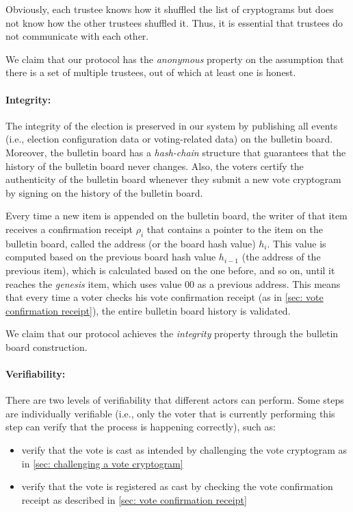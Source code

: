 Obviously, each trustee knows how it shuffled the list of cryptograms but does not know how the other trustees shuffled it. Thus, it is essential that trustees do not communicate with each other.

We claim that our protocol has the \textit{anonymous} property on the assumption that there is a set of multiple trustees, out of which at least one is honest.


\paragraph{Integrity:}
The integrity of the election is preserved in our system by publishing all events (i.e., election configuration data or voting-related data) on the bulletin board. Moreover, the bulletin board has a \textit{hash-chain} structure that guarantees that the history of the bulletin board never changes. Also, the voters certify the authenticity of the bulletin board whenever they submit a new vote cryptogram by signing on the history of the bulletin board.

Every time a new item is appended on the bulletin board, the writer of that item receives a confirmation receipt $\rho_i$ that contains a pointer to the item on the bulletin board, called the address (or the board hash value) $h_i$. This value is computed based on the previous board hash value $h_{i-1}$ (the address of the previous item), which is calculated based on the one before, and so on, until it reaches the \textit{genesis} item, which uses value 00 as a previous address. This means that every time a voter checks his vote confirmation receipt (as in \cref{sec: vote confirmation receipt}), the entire bulletin board history is validated.

We claim that our protocol achieves the \textit{integrity} property through the bulletin board construction.


\paragraph{Verifiability:}
There are two levels of verifiability that different actors can perform. Some steps are individually verifiable (i.e., only the voter that is currently performing this step can verify that the process is happening correctly), such as:
\begin{itemize}
    \item verify that the vote is cast as intended by challenging the vote cryptogram as in \cref{sec: challenging a vote cryptogram}
    \item verify that the vote is registered as cast by checking the vote confirmation receipt as described in  \cref{sec: vote confirmation receipt}
\end{itemize}

